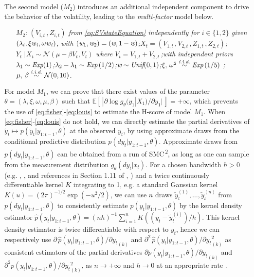 \documentclass[12pt]{article}
\theoremstyle{plain}
\theoremstyle{definition}
\begin{document}
	The second model ($M_2$) introduces an additional independent component to drive the behavior of the volatility, leading to the \emph{multi-factor} model below.
	\begin{itemize}
		\item [$M_2$:]\textit{$(V_{i,t}\,,Z_{i,t})$ from \eqref{eq:SVstateEquation} independently for $i\in\{1,2\}$ given $\left(\lambda_i,\xi\text{\emph{w}}_i,\omega\text{\emph{w}}_i\right)$, with $(\emph{\text{w}}_1,\emph{\text{w}}_2) = (\emph{\text{w}},1-\emph{\text{w}})$;\quad $X_{t}=(V_{1,t}\,,V_{2,t}\,,Z_{1,t}\,,Z_{2,t})$;\quad $Y_{t}\,|\,X_t \sim \mathcal{N}\left(\mu + \beta V_{t}, V_{t}\right)$ where $V_{t} = V_{1,t} + V_{2,t}$\,;\quad with independent priors \, $\lambda_1\sim\emph{\text{Exp}}(1)$;\quad $\lambda_2-\lambda_1\sim\emph{\text{Exp}}\left(1/2\right)$;\quad $\emph{\text{w}}\sim\emph{\text{Unif}}(0,1)$;\quad $\xi,\,\omega^2 \stackrel{\emph{\text{i.i.d.}}}{\sim}\emph{\text{Exp}}\left(1/5\right)$ ;\quad $\mu,\,\beta \stackrel{\emph{\text{i.i.d.}}}{\sim} \mathcal{N}(0,10)$.}
	\end{itemize}
	
	For model $M_1$, we can prove that there exist values of the parameter $\theta=(\lambda,\xi,\omega,\mu,\beta)$ such that $\mathbb{E}[\,|\partial \log
	g_\theta (y_1|X_1) / \partial y_1|\,] = +\infty$, which prevents the use of
	\eqref{eq:fisher}-\eqref{eq:louis} to estimate the H-score of model $M_1$.
	When \eqref{eq:fisher}-\eqref{eq:louis} do not hold, 
	we can directly estimate the partial derivatives of $\tilde{y}_t\mapsto p(\tilde{y}_t|y_{1:t-1},\theta)$
	at the observed $y_t$, by using approximate draws from the conditional predictive distribution $p(dy_t|y_{1:t-1},\theta)$. Approximate draws from $p(dy_t|y_{1:t-1},\theta)$
	can be obtained from a run of SMC\textsuperscript{\,2}, as long as one can sample from the measurement distribution $g_\theta(dy_t|x_t)$. For a chosen bandwidth $h>0$ (e.g. \citeauthor{hardle1990bandwidth}, \citeyear{hardle1990bandwidth}, and references in Section 1.11 of \citeauthor{tsybakov2009introduction}, \citeyear{tsybakov2009introduction}) and a twice continuously differentiable kernel $K$
	integrating to 1, e.g.\! a standard Gaussian kernel
	$K(u)=(2\pi)^{-1/2}\exp(-u^2/2)$, we can use $n$ draws
	$\tilde{y}_{t}^{(1)},\dots,\tilde{y}_{t}^{(n)}$ from $p(dy_t|y_{1:t-1},\theta)$
	to consistently estimate $p(y_t|y_{1:t-1},\theta)$ by the kernel density
	estimator $\widehat{p}(y_t|y_{1:t-1},\theta)=(nh)^{-1}\sum_{i=1}^n
	K\!(({y_t-\tilde{y}_t^{(i)}})/{h})$.
	This kernel density estimator is twice differentiable with respect to $y_t$, hence we can respectively use ${\partial\,\widehat{p}({y}_t|y_{1:t-1},\theta)}/{\partial {{y_t}}_{(k)}}$ and ${\partial^2\,\widehat{p}({y}_t|y_{1:t-1},\theta)}/{\partial {{y_t}}_{(k)}^2}$ as consistent estimators of the partial derivatives ${\partial p({y}_t|y_{1:t-1},\theta)}/{\partial {{y_t}}_{(k)}}$ and ${\partial^2 p({y}_t|y_{1:t-1},\theta)}/{\partial {{y_t}}_{(k)}^2}$, as $n\to+\infty$ and $h\to 0$ at an appropriate rate \citep[e.g.][]{bhattacharya1967estimation}.
	
\end{document}

